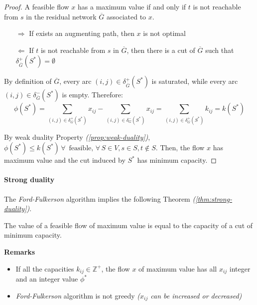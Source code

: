 \documentclass[english]{article}
\begin{document}
\begin{proof}
  A feasible flow \(x\) has a maximum value if and only if \(t\) is not reachable from \(s\) in the residual network \(\overline{G}\) associated to \(x\).

  \begin{itemize}
    \item[\(\Rightarrow\)] If exists an augmenting path, then \(x\) is not optimal
    \item[\(\Leftarrow\)] If \(t\) is not reachable from \(s\) in \(\overline{G}\), then there is a cut of \(\overline{G}\) such that \(\delta^+_{\overline{G}}(S^\ast) = \emptyset\)
  \end{itemize}

  By definition of \(\overline{G}\), every arc \(\left( i, j \right) \in \delta^+_{\overline{G}}(S^\ast)\) is saturated, while every arc \(\left( i, j \right) \in \delta^-_{\overline{G}}(S^\ast)\) is empty.
  Therefore:
  \[ \phi(S^\ast) = \displaystyle \sum_{\left( i, j \right) \in \delta^+_G(S^\ast) } x_{ij} - \displaystyle \sum_{\left( i, j \right) \in \delta^-_G(S^\ast) } x_{ij} = \displaystyle \sum_{\left( i, j \right) \in \delta^+_G(S^\ast) } k_{ij} = k(S^\ast) \]

  By weak duality Property \textit{(\ref{prop:weak-duality})}, \(\phi(S^\ast) \leq k(S^\ast) \, \forall \, \text{ feasible}, \, \forall \, S \in V, s\in S, t \notin S\).
  Then, the flow \(x\) has maximum value and the cut induced by \(S^\ast\) has minimum capacity.
\end{proof}

\paragraph{Strong duality}

The \textit{Ford-Fulkerson} algorithm implies the following Theorem \textit{(\ref{thm:strong-duality})}.

\begin{theorem}
  The value of a feasible flow of maximum value is equal to the capacity of a cut of minimum capacity.
  \label{thm:strong-duality}
\end{theorem}

\textbf{Remarks}
\begin{itemize}
  \item If all the capacities \(k_{ij} \in \mathbb{Z}^+\), the flow \(x\) of maximum value has all \(x_{ij}\) integer and an integer value \(\phi^\ast\)
  \item \textit{Ford-Fulkerson} algorithm is not greedy \textit{(\(x_{ij}\) can be increased or decreased)}
\end{itemize}
\end{document}
